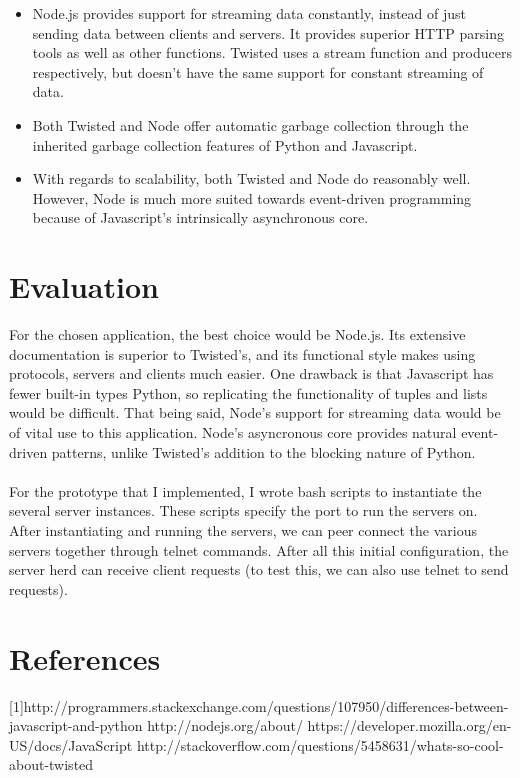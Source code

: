 \documentclass[letterpaper,twocolumn,10pt]{article}
\begin{document}
\begin{itemize}
\item
Node.js provides support for streaming data constantly, instead of just sending data between clients and servers. It provides superior HTTP parsing tools as well as other functions. Twisted uses a stream function and producers respectively, but doesn't have the same support for constant streaming of data.
\item
Both Twisted and Node offer automatic garbage collection through the inherited garbage collection features of Python and Javascript.
\item 
With regards to scalability, both Twisted and Node do reasonably well. However, Node is much more suited towards event-driven programming because of Javascript's intrinsically asynchronous core.
\end{itemize}

\section{Evaluation}

For the chosen application, the best choice would be Node.js. Its extensive documentation is superior to Twisted's, and its functional style makes using protocols, servers and clients much easier.  One drawback is that Javascript has fewer built-in types Python, so replicating the functionality of tuples and lists would be difficult. That being said, Node's support for streaming data would be of vital use to this application. Node's asyncronous core provides natural event-driven patterns, unlike Twisted's addition to the blocking nature of Python.
\\
\\
For the prototype that I implemented, I wrote bash scripts to instantiate the several server instances. These scripts specify the port to run the servers on. After instantiating and running the servers, we can peer connect the various servers together through telnet commands. After all this initial configuration, the server herd can receive client requests (to test this, we can also use telnet to send requests).

\section{References}
[1]http://programmers.stackexchange.com/questions/107950/differences-between-javascript-and-python \newline
[2]http://nodejs.org/about/ \newline
[3]https://developer.mozilla.org/en-US/docs/JavaScript \newline
[4]http://stackoverflow.com/questions/5458631/whats-so-cool-about-twisted \newline
\end{document}

